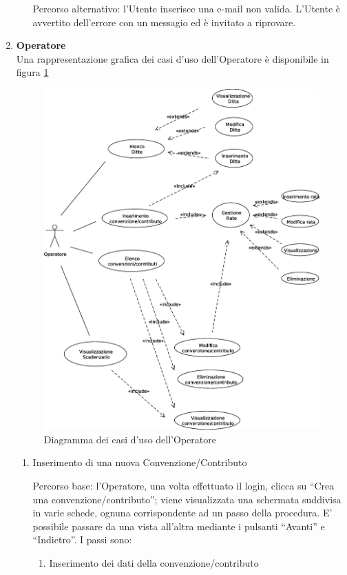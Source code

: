 \begin{enumerate}
\begin{enumerate}
  Percorso alternativo:
  l'Utente inserisce una e-mail non valida. L'Utente è avvertito dell'errore con un messagio ed è invitato a riprovare.
\end{enumerate}



\item \textbf{Operatore}\\
Una rappresentazione grafica dei casi d'uso dell'Operatore è disponibile in figura \ref{use_case_diag_operator}
\begin{figure}[h]
  \caption{Diagramma dei casi d'uso dell'Operatore}
  \label{use_case_diag_operator}
  \centering
    \includegraphics[width=1\textwidth]{images/casi_uso_operatore.eps}
\end{figure}

\begin{enumerate}
  \item Inserimento di una nuova Convenzione/Contributo\\ \label{UC_new_contract}
  
  Percorso base:
  l'Operatore, una volta effettuato il login, clicca su ``Crea una convenzione/contributo''; viene visualizzata una schermata suddivisa in varie schede,
  ognuna corrispondente ad un passo della procedura. E' possibile passare da una vista all'altra mediante i pulsanti ``Avanti'' e ``Indietro''. I passi sono:
  \begin{enumerate}
    \item Inserimento dei dati della convenzione/contributo\\
      

\end{enumerate}
\end{enumerate}
\end{enumerate}
